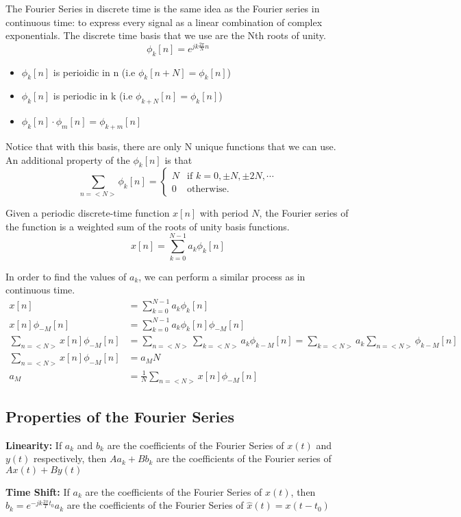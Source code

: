 The Fourier Series in discrete time is the same idea as the Fourier series in continuous time: 
to express every signal as a linear combination of complex exponentials.
The discrete time basis that we use are the Nth roots of unity.
\[
\phi_k[n] = e^{jk\frac{2\pi}{N}n}
\]
\begin{itemize}
    \item $\phi_k[n]$ is perioidic in n (i.e $\phi_k[n+N] = \phi_k[n]$)
    \item $\phi_k[n]$ is periodic in k (i.e $\phi_{k+N}[n] = \phi_k[n]$)
    \item $\phi_k[n]\cdot \phi_m[n] = \phi_{k + m}[n]$
\end{itemize}
Notice that with this basis, there are only N unique functions that we can use.
An additional property of the $\phi_k[n]$ is that
\[
  \sum_{n=<N>}{\phi_k[n]} = \begin{cases}
	N & \text{if } k = 0, \pm N, \pm 2N, \cdots\\
	0 & \text{otherwise.}
  \end{cases}
\]
\begin{definition}
    Given a periodic discrete-time function $x[n]$ with period $N$, 
    the Fourier series of the function is a weighted sum of the roots of unity basis functions.
    \[
x[n] = \sum_{k=0}^{N-1}{a_k\phi_k[n]}
\]
\end{definition}
In order to find the values of $a_k$, we can perform a similar process as in continuous time.
\begin{align*}
  x[n] &= \sum_{k=0}^{N-1}{a_k\phi_k[n]}\\
  x[n]\phi_{-M}[n] &= \sum_{k=0}^{N-1}{a_k\phi_k[n]\phi_{-M}[n]}\\
  \sum_{n=<N>}{x[n]\phi_{-M}[n]} &= \sum_{n=<N>}{\sum_{k=<N>}{a_k\phi_{k-M}[n]}} = \sum_{k=<N>}{a_k\sum_{n=<N>}{\phi_{k-M}[n]}}\\
  \sum_{n=<N>}{x[n]\phi_{-M}[n]} &= a_MN\\
  a_M &= \frac{1}{N}\sum_{n=<N>}{x[n]\phi_{-M}[n]}
\end{align*}
\subsection{Properties of the Fourier Series}
\textbf{Linearity: }
If $a_k$ and $b_k$ are the coefficients of the Fourier Series of $x(t)$ and $y(t)$ respectively, then
$Aa_k + Bb_k$ are the coefficients of the Fourier series of $Ax(t)+By(t)$

\textbf{Time Shift: }
If $a_k$ are the coefficients of the Fourier Series of $x(t)$,
then $b_k = e^{-jk\frac{2\pi}{T}t_0}a_k$ are the coefficients of the Fourier Series of $\hat{x}(t)=x(t-t_0)$

